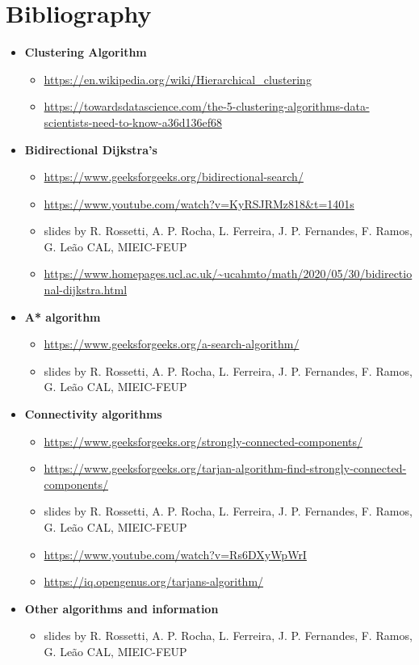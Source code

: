 \chapter{Bibliography}

\begin{itemize}
    \item \textbf{Clustering Algorithm}
    \begin{itemize}
        \item \url{https://en.wikipedia.org/wiki/Hierarchical_clustering}
        \item \url{https://towardsdatascience.com/the-5-clustering-algorithms-data-scientists-need-to-know-a36d136ef68}

    \end{itemize}
    \item \textbf{Bidirectional Dijkstra's}
    \begin{itemize}
        \item \url{https://www.geeksforgeeks.org/bidirectional-search/}
        \item \url{https://www.youtube.com/watch?v=KyRSJRMz818&t=1401s}
        \item slides by R. Rossetti, A. P. Rocha, L. Ferreira, J. P. Fernandes, F. Ramos, G. Leão
        CAL, MIEIC-FEUP
        \item \url{https://www.homepages.ucl.ac.uk/~ucahmto/math/2020/05/30/bidirectional-dijkstra.html}
    \end{itemize}
    \item \textbf{A* algorithm}
    \begin{itemize}
        \item \url{https://www.geeksforgeeks.org/a-search-algorithm/}
        \item slides by R. Rossetti, A. P. Rocha, L. Ferreira, J. P. Fernandes, F. Ramos, G. Leão
        CAL, MIEIC-FEUP
    \end{itemize}
    \item \textbf{Connectivity algorithms}
    \begin{itemize}
        \item \url{https://www.geeksforgeeks.org/strongly-connected-components/}
        \item \url{https://www.geeksforgeeks.org/tarjan-algorithm-find-strongly-connected-components/}
        \item slides by R. Rossetti, A. P. Rocha, L. Ferreira, J. P. Fernandes, F. Ramos, G. Leão
        CAL, MIEIC-FEUP
        \item \url{https://www.youtube.com/watch?v=Rs6DXyWpWrI}
        \item \url{https://iq.opengenus.org/tarjans-algorithm/}
    \end{itemize}
    \item \textbf{Other algorithms and information}
    \begin{itemize}
        \item slides by R. Rossetti, A. P. Rocha, L. Ferreira, J. P. Fernandes, F. Ramos, G. Leão
        CAL, MIEIC-FEUP
    \end{itemize}
\end{itemize}